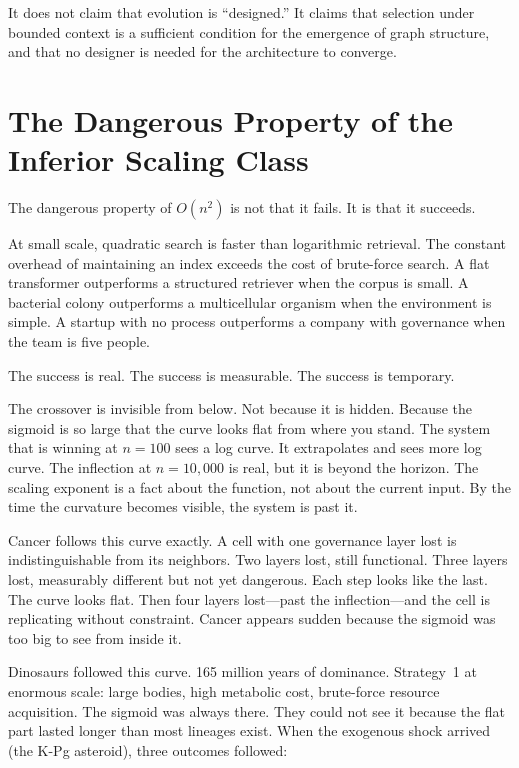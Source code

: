 \documentclass[11pt]{article}
\theoremstyle{definition}
\begin{document}
It does not claim that evolution is ``designed.'' It claims that
selection under bounded context is a sufficient condition for the
emergence of graph structure, and that no designer is needed for
the architecture to converge.

\section{The Dangerous Property of the Inferior Scaling Class}
\label{sec:dangerous}

The dangerous property of $O(n^2)$ is not that it fails. It is that
it succeeds.

At small scale, quadratic search is faster than logarithmic retrieval.
The constant overhead of maintaining an index exceeds the cost of
brute-force search. A flat transformer outperforms a structured
retriever when the corpus is small. A bacterial colony outperforms a
multicellular organism when the environment is simple. A startup with
no process outperforms a company with governance when the team is
five people.

The success is real. The success is measurable. The success is
temporary.

The crossover is invisible from below. Not because it is hidden.
Because the sigmoid is so large that the curve looks flat from where
you stand. The system that is winning at $n = 100$ sees a log curve.
It extrapolates and sees more log curve. The inflection at
$n = 10{,}000$ is real, but it is beyond the horizon. The scaling
exponent is a fact about the function, not about the current input.
By the time the curvature becomes visible, the system is past it.

Cancer follows this curve exactly. A cell with one governance layer
lost is indistinguishable from its neighbors. Two layers lost, still
functional. Three layers lost, measurably different but not yet
dangerous. Each step looks like the last. The curve looks flat. Then
four layers lost---past the inflection---and the cell is replicating
without constraint. Cancer appears sudden because the sigmoid was
too big to see from inside it.

Dinosaurs followed this curve. 165 million years of dominance.
Strategy~1 at enormous scale: large bodies, high metabolic cost,
brute-force resource acquisition. The sigmoid was always there.
They could not see it because the flat part lasted longer than
most lineages exist. When the exogenous shock arrived (the K-Pg
asteroid), three outcomes followed:
\end{document}
